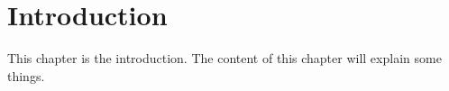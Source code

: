 \chapter{Introduction}
This chapter is the introduction.  The content of this chapter will explain some things.

